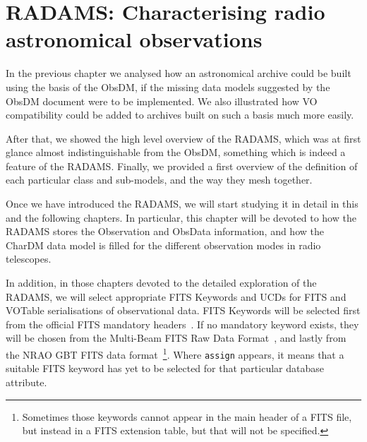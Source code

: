 \chapter[RADAMS: Characterising radio astronomical observations]
[RADAMS: Characterising radio observations]
{RADAMS: Characterising radio astronomical observations} 
\label{cha:radamscharobs}
	
	
	In the previous chapter we analysed how an astronomical archive
	could be built using the basis of the ObsDM, if the missing
	data models suggested by the ObsDM document were to be
	implemented. We also illustrated how VO compatibility could be
	added to archives built on such a basis much more easily.
	
	After that, we showed the high level overview of the RADAMS,
	which was at first glance almost indistinguishable from the
	ObsDM, something which is indeed a feature of the RADAMS.
	Finally, we provided a first overview of the definition of
	each particular class and sub-models, and the way they mesh
	together.
	
	Once we have introduced the RADAMS,  we will start studying it
	in detail in this and the following chapters.  In particular,
	this chapter will be devoted to how the RADAMS stores the
	Observation and ObsData information, and how the 
	CharDM data model is filled for the different observation
	modes in radio telescopes.
	
	In addition, in those chapters devoted to the
	detailed exploration of the RADAMS, we will select appropriate
	FITS Keywords  and UCDs for FITS and VOTable serialisations of
	observational data.  FITS Keywords will be selected first from
	the official FITS mandatory headers~\cite{Hanisch:1999fk}.  If
	no mandatory   keyword exists,   they will be chosen  from the
	Multi-Beam FITS Raw Data Format~\cite{MudPolHat0512Multi-Beam},
	and lastly from the NRAO GBT FITS data
	format~\cite{PreCla0412Device}\footnote{Sometimes those
	keywords cannot appear in the main header of a FITS file, but
	instead in a FITS extension table, but that will not be
	specified.}. Where \texttt{assign} appears, it means
	that a suitable FITS keyword has yet to be
	selected for that particular database attribute.
	
